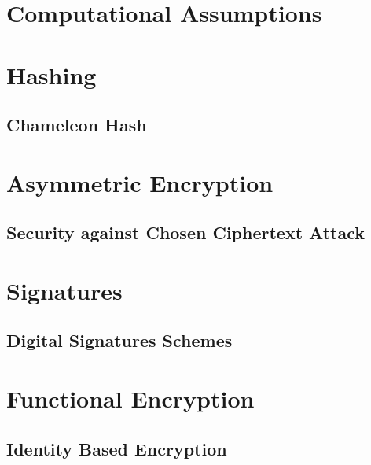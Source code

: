 








\maketitle

\ifTableOfContents 
	\tableofcontents
	\newpage
\fi

\chapter{Computational Assumptions}

\chapter{Hashing}
	\section{Chameleon Hash}
	

\chapter{Asymmetric Encryption}
	\section{Security against Chosen Ciphertext Attack}
	

\chapter{Signatures}
	\section{Digital Signatures Schemes}
	

\chapter{Functional Encryption}
	\section{Identity Based Encryption}
	
	





\appendix


